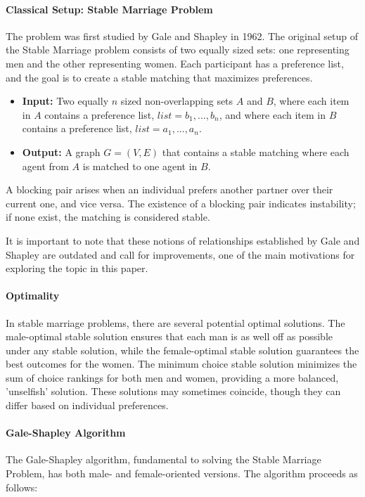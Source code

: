 \paragraph{Classical Setup: Stable Marriage Problem}
The problem was first studied by Gale and Shapley in 1962. The original setup of the Stable Marriage problem consists of two equally sized sets: one representing men and the other representing women. Each participant has a preference list, and the goal is to create a stable matching that maximizes preferences. 
\\
\begin{itemize}
    \item \textbf{Input:} Two equally $n$ sized non-overlapping sets $A$ and $B$, where each item in $A$ contains a preference list, $list = {b_1, ..., b_n }$, and where each item in $B$ contains a preference list, $list = {a_1, ..., a_n }$.
    \item \textbf{Output:} A graph $G = (V,E)$ that contains a stable matching where each agent from $A$ is matched to one agent in $B$. 
\end{itemize}

A blocking pair arises when an individual prefers another partner over their current one, and vice versa. The existence of a blocking pair indicates instability; if none exist, the matching is considered stable.
\cite{gusfield}

It is important to note that these notions of relationships established by Gale and Shapley are outdated and call for improvements, one of the main motivations for exploring the topic in this paper.

\paragraph{Optimality}
In stable marriage problems, there are several potential optimal solutions. The male-optimal stable solution ensures that each man is as well off as possible under any stable solution, while the female-optimal stable solution guarantees the best outcomes for the women. The minimum choice stable solution minimizes the sum of choice rankings for both men and women, providing a more balanced, 'unselfish' solution. These solutions may sometimes coincide, though they can differ based on individual preferences.
\cite{mcvitie}

\paragraph{Gale-Shapley Algorithm}
The Gale-Shapley algorithm, fundamental to solving the Stable Marriage Problem, has both male- and female-oriented versions. The algorithm proceeds as follows:

